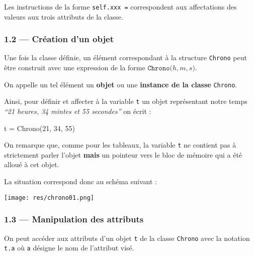 \documentclass[a4paper,17pt]{extarticle}
\newenvironment{Shaded}{}{}
\newcommand{\DecValTok}[1]{\textcolor[rgb]{0.25,0.63,0.44}{{#1}}}
\newcommand{\NormalTok}[1]{{#1}}
\newcommand{\OperatorTok}[1]{\textcolor[rgb]{0.40,0.40,0.40}{{#1}}}
\begin{document}
Les instructions de la forme \texttt{self.xxx\ =} correspondent aux
affectations des valeurs aux trois attributs de la classe.

    \hypertarget{cruxe9ation-dun-objet}{%
\subsubsection{1.2 --- Création d'un
objet}\label{cruxe9ation-dun-objet}}

    Une fois la classe définie, un élément correspondant à la structure
\texttt{Chrono} peut être construit avec une expression de la forme
\(\texttt{Chrono(}h, m, s \texttt{)}\).
\begin{retenir}
    On appelle un tel élément un \textbf{objet} ou une \textbf{instance de
la classe} \texttt{Chrono}.

        \end{retenir}\begin{exemple}
    Ainsi, pour définir et affecter à la variable \texttt{t} un objet
représentant notre temps \emph{``21 heures, 34 mintes et 55 secondes''}
on écrit :

\begin{Shaded}
\begin{Highlighting}[]
\NormalTok{t }\OperatorTok{=}\NormalTok{ Chrono(}\DecValTok{21}\NormalTok{, }\DecValTok{34}\NormalTok{, }\DecValTok{55}\NormalTok{)}
\end{Highlighting}
\end{Shaded}

        \end{exemple}\begin{remarque}
    On remarque que, comme pour les tableaux, la variable \texttt{t} ne
contient pas à strictement parler l'objet \textbf{mais} un pointeur vers
le bloc de mémoire qui a été alloué à cet objet.

La situation correspond donc au schéma suivant :

\texttt{[image: res/chrono01.png]}

        \end{remarque}
    \hypertarget{manipulation-des-attributs}{%
\subsubsection{1.3 --- Manipulation des
attributs}\label{manipulation-des-attributs}}

    On peut accéder aux attributs d'un objet \texttt{t} de la classe
\texttt{Chrono} avec la notation \texttt{t.a} où \texttt{a} désigne le
nom de l'attribut visé.
\end{document}
